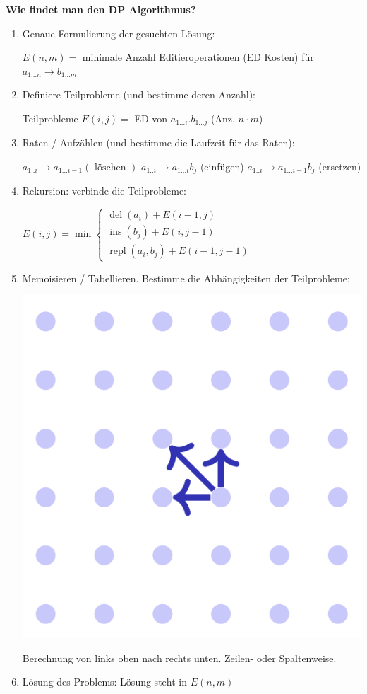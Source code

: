 \begin{sectionbox}
\textbf{Wie findet man den DP Algorithmus?}\par
\begin{enumerate}
    \item Genaue Formulierung der gesuchten Lösung:
    \par $E(n, m)=$ minimale Anzahl Editieroperationen (ED Kosten) für $a_{1 \ldots n} \rightarrow b_{1 \ldots m}$
    \item Definiere Teilprobleme (und bestimme deren Anzahl):
    \par Teilprobleme $E(i, j)=$ ED von $a_{1 \dots i} . b_{1 \dots j}$ (Anz. $n \cdot m$)
    \item Raten / Aufzählen (und bestimme die Laufzeit für das Raten):
    \par $a_{1 . . i} \rightarrow a_{1 \ldots i-1}(\text { löschen })$
    $a_{1 . . i} \rightarrow a_{1 \ldots i} b_{j}$ (einfügen)
    $a_{1 . . i} \rightarrow a_{1 \ldots i-1} b_{j}$ (ersetzen)
    \item Rekursion: verbinde die Teilprobleme:
    \par \begin{center}
        $E(i, j)=\min \left\{\begin{array}{l}\operatorname{del}\left(a_{i}\right)+E(i-1, j) \\ \operatorname{ins}\left(b_{j}\right)+E(i, j-1) \\ \operatorname{repl}\left(a_{i}, b_{j}\right)+E(i-1, j-1)\end{array}\right.$
    \end{center}
    \item Memoisieren / Tabellieren. Bestimme die Abhängigkeiten der Teilprobleme:
    \par \begin{center}
        \includegraphics[width=0.4\columnwidth]{../img/Lst_Abh.png}
    \end{center}
    \par Berechnung von links oben nach rechts unten. Zeilen- oder Spaltenweise.
    \item Lösung des Problems: Lösung steht in $E(n, m)$
\end{enumerate}\vspace{7px}
\end{sectionbox}
